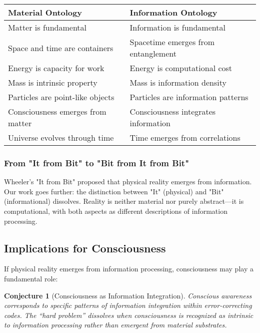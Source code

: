 \documentclass[12pt,a4paper]{article}
\newtheorem{conjecture}[theorem]{Conjecture}
\theoremstyle{remark}
\begin{document}
\begin{center}
\begin{tabular}{|p{}|p{}|}
\hline
\textbf{Material Ontology} & \textbf{Information Ontology} \\
\hline
Matter is fundamental & Information is fundamental \\
Space and time are containers & Spacetime emerges from entanglement \\
Energy is capacity for work & Energy is computational cost \\
Mass is intrinsic property & Mass is information density \\
Particles are point-like objects & Particles are information patterns \\
Consciousness emerges from matter & Consciousness integrates information \\
Universe evolves through time & Time emerges from correlations \\
\hline
\end{tabular}
\end{center}

\subsubsection{From "It from Bit" to "Bit from It from Bit"}

Wheeler's "It from Bit" proposed that physical reality emerges from information. Our work goes further: the distinction between "It" (physical) and "Bit" (informational) dissolves. Reality is neither material nor purely abstract—it is computational, with both aspects as different descriptions of information processing.

\subsection{Implications for Consciousness}
\label{sec:consciousness}

If physical reality emerges from information processing, consciousness may play a fundamental role:

\begin{conjecture}[Consciousness as Information Integration]
Conscious awareness corresponds to specific patterns of information integration within error-correcting codes. The ``hard problem'' dissolves when consciousness is recognized as intrinsic to information processing rather than emergent from material substrates.
\end{conjecture}
\end{document}
